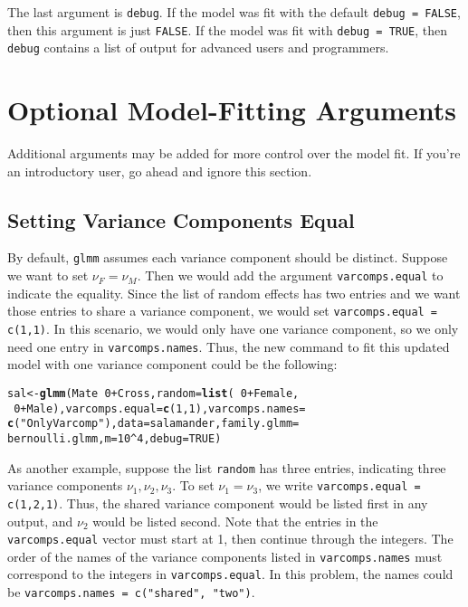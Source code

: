\documentclass[11pt]{article}\usepackage[]{graphicx}\usepackage[]{color}
\makeatletter
\newcommand{\hlnum}[1]{\textcolor[rgb]{0.686,0.059,0.569}{#1}}%
\newcommand{\hlstr}[1]{\textcolor[rgb]{0.192,0.494,0.8}{#1}}%
\newcommand{\hlopt}[1]{\textcolor[rgb]{0,0,0}{#1}}%
\newcommand{\hlstd}[1]{\textcolor[rgb]{0.345,0.345,0.345}{#1}}%
\newcommand{\hlkwb}[1]{\textcolor[rgb]{0.69,0.353,0.396}{#1}}%
\newcommand{\hlkwc}[1]{\textcolor[rgb]{0.333,0.667,0.333}{#1}}%
\newcommand{\hlkwd}[1]{\textcolor[rgb]{0.737,0.353,0.396}{\textbf{#1}}}%
\newenvironment{kframe}{%
 \def\at@end@of@kframe{}%
 \ifinner\ifhmode%
  \def\at@end@of@kframe{\end{minipage}}%
  \begin{minipage}{\columnwidth}%
 \fi\fi%
 \def\FrameCommand##1{\hskip\@totalleftmargin \hskip-\fboxsep
 \colorbox{shadecolor}{##1}\hskip-\fboxsep
     \hskip-\linewidth \hskip-\@totalleftmargin \hskip\columnwidth}%
 \MakeFramed {\advance\hsize-\width
   \@totalleftmargin\z@ \linewidth\hsize
   \@setminipage}}%
 {\par\unskip\endMakeFramed%
 \at@end@of@kframe}
\newenvironment{knitrout}{}{} %
\makeatother
\begin{document}
The last argument is \texttt{debug}. If the model was fit with the default \texttt{debug = FALSE}, then this argument is just \texttt{FALSE}. If the model was fit with \texttt{debug = TRUE}, then \texttt{debug} contains a list of output for advanced users and programmers.


\section{Optional Model-Fitting Arguments}
Additional arguments may be added for more control over the model fit. If you're an introductory user, go ahead and ignore this section.\\

\subsection{Setting Variance Components Equal}
By default, \texttt{glmm} assumes each variance component should be distinct. Suppose we want to set $\nu_F = \nu_M.$ Then we would add the argument \texttt{varcomps.equal} to indicate the equality. Since the list of random effects has two entries and we want those entries to share a variance component, we would set \texttt{varcomps.equal = c(1,1)}. In this scenario, we would only have one variance component, so we only need one entry in \texttt{varcomps.names}. Thus, the new command to fit this updated model with one variance component could be the following: 

\begin{knitrout}
\color{fgcolor}\begin{kframe}
\begin{alltt}
\hlstd{sal} \hlkwb{<-} \hlkwd{glmm}\hlstd{(Mate} \hlopt{~} \hlnum{0} \hlopt{+} \hlstd{Cross,} \hlkwc{random} \hlstd{=} \hlkwd{list}\hlstd{(}\hlopt{~} \hlnum{0} \hlopt{+} \hlstd{Female,}
\hlopt{~} \hlnum{0} \hlopt{+} \hlstd{Male),} \hlkwc{varcomps.equal} \hlstd{=} \hlkwd{c}\hlstd{(} \hlnum{1}\hlstd{,} \hlnum{1}\hlstd{),} \hlkwc{varcomps.names} \hlstd{=}
\hlkwd{c}\hlstd{(}\hlstr{"Only Varcomp"}\hlstd{),} \hlkwc{data} \hlstd{= salamander,} \hlkwc{family.glmm} \hlstd{=}
\hlstd{bernoulli.glmm,} \hlkwc{m} \hlstd{=} \hlnum{10}\hlopt{^}\hlnum{4}\hlstd{,} \hlkwc{debug} \hlstd{=} \hlnum{TRUE}\hlstd{)}
\end{alltt}
\end{kframe}
\end{knitrout}
As another example, suppose the list \texttt{random} has three entries, indicating three variance components $\nu_1, \nu_2, \nu_3$. To set $\nu_1= \nu_3$, we write \texttt{varcomps.equal = c(1,2,1)}. Thus, the shared variance component would be listed first in any output, and $\nu_2$ would be listed second. Note that the entries in the \texttt{varcomps.equal} vector must start at 1, then continue through the integers. The order of the names of the variance components listed in \texttt{varcomps.names} must correspond to the integers in \texttt{varcomps.equal}. In this problem, the names could be \texttt{varcomps.names = c("shared", "two")}.  \\
\end{document}
